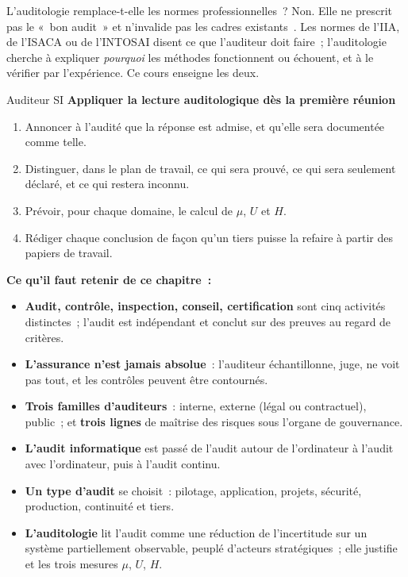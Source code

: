 \begin{boiteRemarque}{L'auditologie remplace-t-elle les normes professionnelles~?}
Non. Elle ne prescrit pas le «~bon audit~» et n'invalide pas les cadres
existants~\cite{minka2026auditologie}. Les normes de l'IIA, de l'ISACA ou de
l'INTOSAI disent ce que l'auditeur doit faire~; l'auditologie cherche à
expliquer \emph{pourquoi} les méthodes fonctionnent ou échouent, et à le
vérifier par l'expérience. Ce cours enseigne les deux.
\end{boiteRemarque}

\begin{boxmetier}{Auditeur SI}
\textbf{Appliquer la lecture auditologique dès la première réunion}
\begin{enumerate}
    \item Annoncer à l'audité que la réponse \NEK{} est admise, et qu'elle
          sera documentée comme telle.
    \item Distinguer, dans le plan de travail, ce qui sera prouvé, ce qui
          sera seulement déclaré, et ce qui restera inconnu.
    \item Prévoir, pour chaque domaine, le calcul de $\mu$, $U$ et $H$.
    \item Rédiger chaque conclusion de façon qu'un tiers puisse la refaire à
          partir des papiers de travail.
\end{enumerate}
\end{boxmetier}

\separateur

\begin{boxresume}
\textbf{Ce qu'il faut retenir de ce chapitre~:}
\begin{itemize}
    \item \textbf{Audit, contrôle, inspection, conseil, certification} sont
          cinq activités distinctes~; l'audit est indépendant et conclut sur
          des preuves au regard de critères.
    \item \textbf{L'assurance n'est jamais absolue}~: l'auditeur
          échantillonne, juge, ne voit pas tout, et les contrôles peuvent
          être contournés.
    \item \textbf{Trois familles d'auditeurs}~: interne, externe (légal ou
          contractuel), public~; et \textbf{trois lignes} de maîtrise des
          risques sous l'organe de gouvernance.
    \item \textbf{L'audit informatique} est passé de l'audit autour de
          l'ordinateur à l'audit avec l'ordinateur, puis à l'audit continu.
    \item \textbf{Un type d'audit} se choisit~: pilotage, application,
          projets, sécurité, production, continuité et tiers.
    \item \textbf{L'auditologie} lit l'audit comme une réduction de
          l'incertitude sur un système partiellement observable, peuplé
          d'acteurs stratégiques~; elle justifie \NEK{} et les trois mesures
          $\mu$, $U$, $H$.
\end{itemize}
\end{boxresume}

